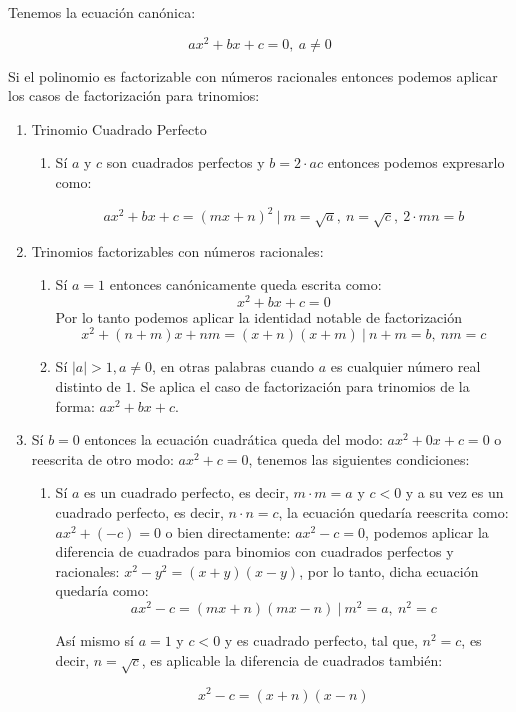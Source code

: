 \documentclass[letterpaper, 10pt, oneside]{book}
\begin{document}
	Tenemos la ecuación canónica: 
	
	$$ax^2+bx+c=0, \ a \neq 0$$
	
	Si el polinomio es factorizable con números racionales entonces podemos aplicar los casos de factorización para trinomios:
	
	\begin{enumerate}
		\item Trinomio Cuadrado Perfecto
		\begin{enumerate}
			\item Sí $a$ y $c$ son cuadrados perfectos y $b=2\cdot{ac}$ entonces podemos expresarlo como: 
			
			$$ax^2+bx+c=(mx+n)^2 \ | \ m=\sqrt{a},  \ n =\sqrt{c}, \ 2\cdot{mn} = b$$
		\end{enumerate}
		\item Trinomios factorizables con números racionales:
		\begin{enumerate}
			\item Sí $a = 1$ entonces canónicamente queda escrita como: $$x^2+bx+c=0$$ Por lo tanto podemos aplicar la identidad notable de factorización $$x^2+(n+m)x+nm=(x+n)(x+m) \ | \ n+m=b, \ nm = c$$
			
			\item Sí $|a|>1, a\neq 0$, en otras palabras cuando $a$ es cualquier número real distinto de $1$. Se aplica el caso de factorización para trinomios de la forma: $ax^2+bx+c$.
		\end{enumerate}
		
		\item Sí $b=0$ entonces la ecuación cuadrática queda del modo: $ax^2+0x+c=0$ o reescrita de otro modo: $ax^2+c=0$, tenemos las siguientes condiciones:
		
		\begin{enumerate}
			\item Sí $a$ es un cuadrado perfecto, es decir, $m\cdot{m} = a$ y $c < 0$ y a su vez es un cuadrado perfecto, es decir, $n\cdot{n} = c$, la ecuación quedaría reescrita como: $ax^2+(-c)=0$ o bien directamente: $ax^2-c=0$, podemos aplicar la diferencia de cuadrados para binomios con cuadrados perfectos y racionales: $x^2-y^2=(x+y)(x-y)$, por lo tanto, dicha ecuación quedaría como: $$ax^2-c=(mx+n)(mx-n) \ | \ m^2=a, \ n^2 = c$$
			
			Así mismo sí $a=1$ y $c<0$ y es cuadrado perfecto, tal que, $n^2=c$, es decir, $n=\sqrt{c}$, es aplicable la diferencia de cuadrados también: 
			
			$$x^2-c=(x+n)(x-n)$$
			

\end{enumerate}
\end{enumerate}
\end{document}
